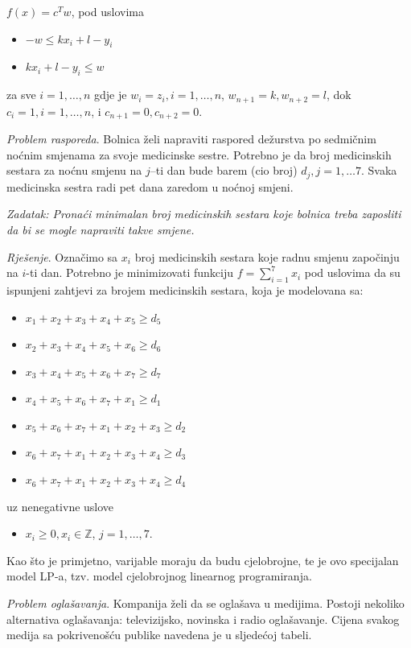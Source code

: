 \documentclass[a4paper, utf8, 11pt, colorlinks]{article}
\begin{document}
$f(x) = c^T w$, pod uslovima
\begin{itemize}
    \item $ -w \leq k x_i + l - y_i$ 
    \item $ k x_i + l - y_i \leq w $
\end{itemize}
za sve $i = 1, \ldots, n$ gdje je 
$w_i = z_i, i=1,\ldots,n$, $w_{n+1} = k, w_{n+2} = l$, dok 
$c_i = 1, i=1,\ldots,n$, i $c_{n+1} = 0, c_{n+2} = 0$. 

\emph{Problem rasporeda}. Bolnica želi napraviti raspored dežurstva po sedmičnim noćnim smjenama za svoje medicinske sestre. Potrebno je da broj medicinskih sestara za noćnu smjenu na $j$--ti dan bude barem (cio broj) $d_j, j = 1,\ldots 7$. Svaka
medicinska sestra radi pet dana zaredom u noćnoj smjeni. 

\emph{Zadatak: Pronaći minimalan broj medicinskih sestara koje bolnica treba zaposliti da bi se mogle napraviti takve smjene.}

\emph{Rješenje}. Označimo sa $x_i$ broj medicinskih sestara koje radnu smjenu započinju na $i$-ti dan. Potrebno je minimizovati funkciju 
$f = \sum_{i=1}^7 x_i$ pod uslovima da su ispunjeni zahtjevi za brojem medicinskih sestara, koja je modelovana sa:
\begin{itemize}
    \item $x_1 + x_2 + x_3 + x_4 + x_5 \geq d_5 $
    \item $x_2 + x_3 + x_4 + x_5 + x_6 \geq d_6$
    \item $x_3 + x_4 + x_5 + x_6 + x_7 \geq d_7$
    \item $x_4 + x_5 + x_6 + x_7 + x_1 \geq d_1 $
    \item $x_5 + x_6 + x_7 + x_1 + x_2 + x_3 \geq d_2$
    \item $x_6 + x_7 + x_1 + x_2 + x_3 + x_4 \geq d_3$
    \item $x_6 + x_7 + x_1 + x_2 + x_3 + x_4 \geq d_4$
\end{itemize}
uz nenegativne uslove 
\begin{itemize}
    \item $x_i \geq 0, x_i \in \mathbb{Z}$, $j=1,\ldots,7.$
\end{itemize}
Kao što je primjetno, varijable moraju da budu cjelobrojne, te je ovo specijalan model LP-a, tzv. model cjelobrojnog linearnog programiranja.

\emph{Problem oglašavanja}. Kompanija želi da se oglašava u medijima. Postoji nekoliko alternativa oglašavanja:  televizijsko, novinska i radio oglašavanje. Cijena svakog medija sa pokrivenošću publike navedena je u sljedećoj tabeli.
\end{document}
